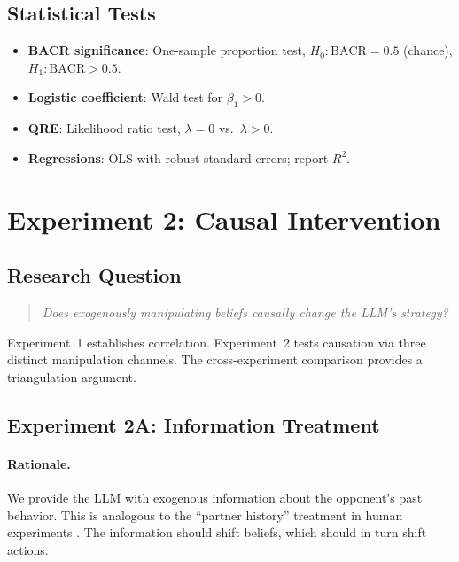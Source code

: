 \documentclass[12pt]{article}
\begin{document}
\subsection{Statistical Tests}

\begin{itemize}[nosep]
    \item \textbf{BACR significance}: One-sample proportion test, $H_0: \text{BACR} = 0.5$ (chance), $H_1: \text{BACR} > 0.5$.
    \item \textbf{Logistic coefficient}: Wald test for $\beta_1 > 0$.
    \item \textbf{QRE}: Likelihood ratio test, $\lambda = 0$ vs.\ $\lambda > 0$.
    \item \textbf{Regressions}: OLS with robust standard errors; report $R^2$.
\end{itemize}


\section{Experiment 2: Causal Intervention}
\label{sec:exp2}

\subsection{Research Question}

\begin{quote}
\emph{Does exogenously manipulating beliefs causally change the LLM's strategy?}
\end{quote}

Experiment~1 establishes correlation. Experiment~2 tests causation via three distinct manipulation channels. The cross-experiment comparison provides a triangulation argument.


\subsection{Experiment 2A: Information Treatment}
\label{sec:exp2a}

\paragraph{Rationale.}
We provide the LLM with exogenous information about the opponent's past behavior. This is analogous to the ``partner history'' treatment in human experiments \citep{charness2006intentions}. The information should shift beliefs, which should in turn shift actions.
\end{document}
